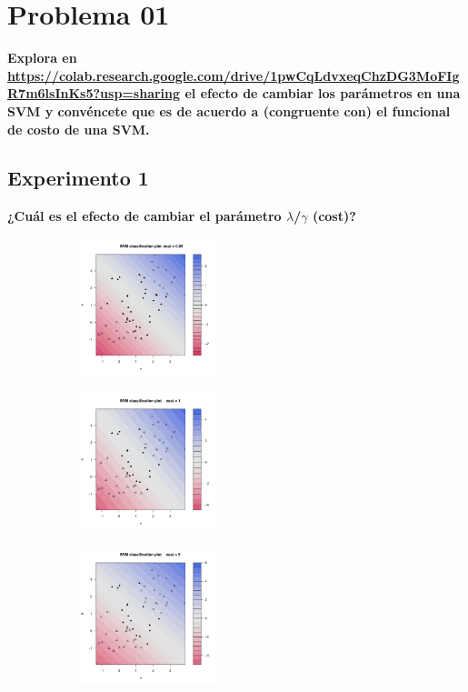 \section*{Problema 01}

\textbf{Explora en
	\url{https://colab.research.google.com/drive/1pwCqLdvxeqChzDG3MoFIgR7m6lsInKs5?usp=sharing} el efecto de cambiar los parámetros en una SVM y convéncete que es de acuerdo a (congruente con) el funcional de costo de una SVM.}

\subsection*{Experimento 1}

\textbf{¿Cuál es el efecto de cambiar el parámetro $\lambda$/$\gamma$ (cost)?}

\begin{figure}[H]
	\centering
	\begin{subfigure}{4cm}
		\includegraphics[width=4cm]{Graphics/Problema_01/Experiment_01_1.pdf}
		\caption{}
	\end{subfigure}
	\begin{subfigure}{4cm}
		\includegraphics[width=4cm]{Graphics/Problema_01/Experiment_01_2.pdf}
		\caption{}
	\end{subfigure}
	\begin{subfigure}{4cm}
		\includegraphics[width=4cm]{Graphics/Problema_01/Experiment_01_3.pdf}

\end{subfigure}
\end{figure}
